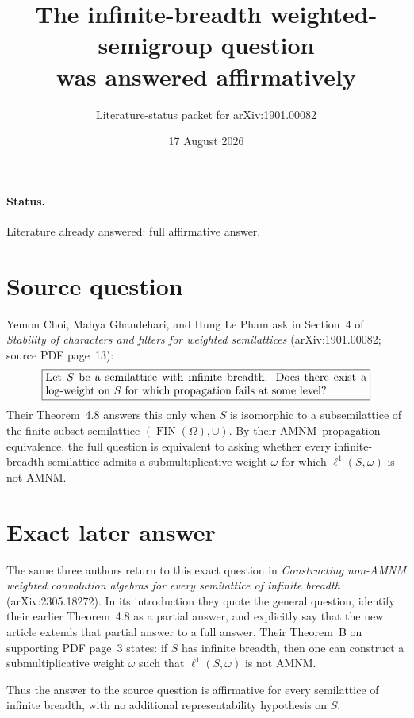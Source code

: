 \documentclass[11pt]{article}
\title{The infinite-breadth weighted-semigroup question\\was answered affirmatively}
\author{Literature-status packet for arXiv:1901.00082}
\date{17 August 2026}
\begin{document}
\maketitle

\paragraph{Status.}
Literature already answered: full affirmative answer.

\section*{Source question}

Yemon Choi, Mahya Ghandehari, and Hung Le Pham ask in Section~4 of
\emph{Stability of characters and filters for weighted semilattices}
(arXiv:1901.00082; source PDF page~13):
\[
 \boxed{\begin{minipage}{0.84\linewidth}
 Let \(S\) be a semilattice with infinite breadth.  Does there exist a
 log-weight on \(S\) for which propagation fails at some level?
 \end{minipage}}
\]
Their Theorem~4.8 answers this only when \(S\) is isomorphic to a
subsemilattice of the finite-subset semilattice
\((\operatorname{FIN}(\Omega),\cup)\).  By their AMNM--propagation
equivalence, the full question is equivalent to asking whether every
infinite-breadth semilattice admits a submultiplicative weight \(\omega\)
for which \(\ell^1(S,\omega)\) is not AMNM.

\section*{Exact later answer}

The same three authors return to this exact question in
\emph{Constructing non-AMNM weighted convolution algebras for every
semilattice of infinite breadth} (arXiv:2305.18272).  In its introduction
they quote the general question, identify their earlier Theorem~4.8 as a
partial answer, and explicitly say that the new article extends that partial
answer to a full answer.  Their Theorem~B on supporting PDF page~3 states:
if \(S\) has infinite breadth, then one can construct a submultiplicative
weight \(\omega\) such that \(\ell^1(S,\omega)\) is not AMNM.

Thus the answer to the source question is affirmative for every semilattice
of infinite breadth, with no additional representability hypothesis on
\(S\).
\end{document}
